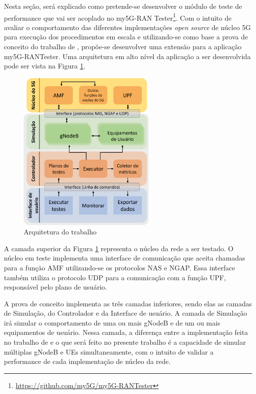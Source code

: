 Nesta seção, será explicado como pretende-se desenvolver o módulo de teste de performance que vai ser acoplado no my5G-RAN Tester\footnote{\url{https://github.com/my5G/my5G-RANTester}}.
Com o intuito de avaliar o comportamento das diferentes implementações \textit{open source} de núcleo 5G para execução dos procedimentos em escala e utilizando-se como base a prova de conceito do trabalho de \cite{Dominato2021}, propõe-se desenvolver uma extensão para a aplicação my5G-RANTester.
Uma arquitetura em alto nível da aplicação a ser desenvolvida pode ser vista na Figura \ref{fig:tester_arch}.

\begin{figure}[!ht]
    \centering
    \includegraphics[width=0.6\textwidth]{TG1/Images/TesterArchtectureV2.png}
    \caption{Arquitetura do trabalho}
    \label{fig:tester_arch}
\end{figure}

A camada superior da Figura \ref{fig:tester_arch} representa o núcleo da rede a ser testado. O núcleo em teste implementa uma interface de comunicação que aceita chamadas para a função AMF utilizando-se os protocolos NAS e NGAP. Essa interface também utiliza o protocolo UDP para a comunicação com a função UPF, responsável pelo plano de usuário.

A prova de conceito implementa as três camadas inferiores, sendo elas as camadas de Simulação, do Controlador e da Interface de usuário.
A camada de Simulação irá simular o comportamento de uma ou mais gNodeB e de um ou mais equipamentos de usuário.
Nessa camada, a diferença entre a implementação feita no trabalho de \cite{Dominato2021} e o que será feito no presente trabalho é a capacidade de simular múltiplas gNodeB e UEs simultaneamente, com o intuito de validar a performance de cada implementação de núcleo da rede.

